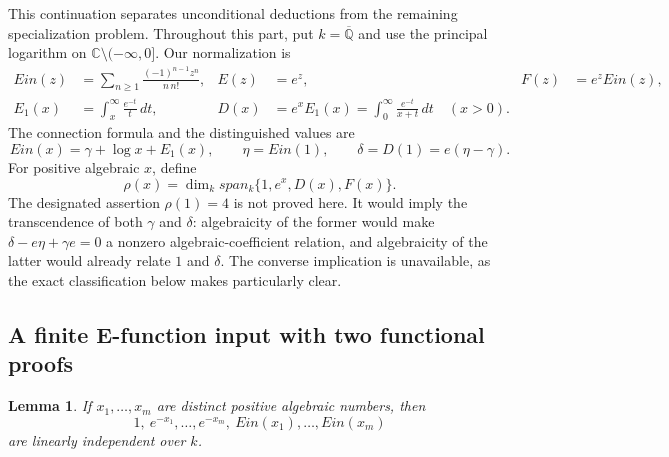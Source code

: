 \documentclass[11pt,a4paper]{article}
\newtheorem{lemma}[theorem]{Lemma}
\theoremstyle{definition}
\theoremstyle{remark}
\theoremstyle{plain}
\numberwithin{equation}{section}
\def\operatorname#1{#1}\def\mathrm#1{#1}}
\providecommand{\rcEin}{\operatorname{Ein}}
\providecommand{\rcSpan}{\operatorname{span}}
\providecommand{\rck}{\overline{\mathbb Q}}
\providecommand{\rcC}{\mathbb C}
\begin{document}
This continuation separates unconditional deductions from the remaining
specialization problem.  Throughout this part, put $k=\rck$ and use the
principal logarithm on $\rcC\setminus(-\infty,0]$.  Our normalization is
\begin{align}
 \rcEin(z)&=\sum_{n\ge1}\frac{(-1)^{n-1}z^n}{n\,n!},&
 E(z)&=e^z,&F(z)&=e^z\rcEin(z),\label{rc:eq:normalization}\\
 E_1(x)&=\int_x^\infty\frac{e^{-t}}t\,dt,&
 D(x)&=e^xE_1(x)=\int_0^\infty\frac{e^{-t}}{x+t}\,dt
 \quad(x>0).\nonumber
\end{align}
The connection formula and the distinguished values are
\begin{equation}\label{rc:eq:connection}
 \rcEin(x)=\gamma+\log x+E_1(x),\qquad
 \eta=\rcEin(1),\qquad \delta=D(1)=e(\eta-\gamma).
\end{equation}
For positive algebraic $x$, define
\begin{equation}\label{rc:eq:rho}
 \rho(x)=\dim_k\rcSpan_k\{1,e^x,D(x),F(x)\}.
\end{equation}
The designated assertion $\rho(1)=4$ is not proved here.  It would imply
the transcendence of both $\gamma$ and $\delta$: algebraicity of the former
would make $\delta-e\eta+\gamma e=0$ a nonzero algebraic-coefficient
relation, and algebraicity of the latter would already relate $1$ and
$\delta$.  The converse implication is unavailable, as the exact
classification below makes particularly clear.

\subsection{A finite E-function input with two functional proofs}

\begin{lemma}\label{rc:lem:evalues}
If $x_1,\ldots,x_m$ are distinct positive algebraic numbers, then
\[
 1,\ e^{-x_1},\ldots,e^{-x_m},\
 \rcEin(x_1),\ldots,\rcEin(x_m)
\]
are linearly independent over $k$.
\end{lemma}
\end{document}
